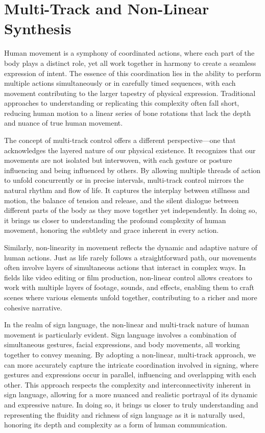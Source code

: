 \documentclass[../../main.tex]{subfiles}
\begin{document}
\chapter{Multi-Track and Non-Linear Synthesis}
\label{ch:multi_track}

Human movement is a symphony of coordinated actions, where each part of the body plays a distinct role, yet all work together in harmony to create a seamless expression of intent. The essence of this coordination lies in the ability to perform multiple actions simultaneously or in carefully timed sequences, with each movement contributing to the larger tapestry of physical expression. Traditional approaches to understanding or replicating this complexity often fall short, reducing human motion to a linear series of bone rotations that lack the depth and nuance of true human movement.

The concept of multi-track control offers a different perspective—one that acknowledges the layered nature of our physical existence. It recognizes that our movements are not isolated but interwoven, with each gesture or posture influencing and being influenced by others. By allowing multiple threads of action to unfold concurrently or in precise intervals, multi-track control mirrors the natural rhythm and flow of life. It captures the interplay between stillness and motion, the balance of tension and release, and the silent dialogue between different parts of the body as they move together yet independently. In doing so, it brings us closer to understanding the profound complexity of human movement, honoring the subtlety and grace inherent in every action.

Similarly, non-linearity in movement reflects the dynamic and adaptive nature of human actions. Just as life rarely follows a straightforward path, our movements often involve layers of simultaneous actions that interact in complex ways. In fields like video editing or film production, non-linear control allows creators to work with multiple layers of footage, sounds, and effects, enabling them to craft scenes where various elements unfold together, contributing to a richer and more cohesive narrative.

In the realm of sign language, the non-linear and multi-track nature of human movement is particularly evident. Sign language involves a combination of simultaneous gestures, facial expressions, and body movements, all working together to convey meaning. By adopting a non-linear, multi-track approach, we can more accurately capture the intricate coordination involved in signing, where gestures and expressions occur in parallel, influencing and overlapping with each other. This approach respects the complexity and interconnectivity inherent in sign language, allowing for a more nuanced and realistic portrayal of its dynamic and expressive nature. In doing so, it brings us closer to truly understanding and representing the fluidity and richness of sign language as it is naturally used, honoring its depth and complexity as a form of human communication.
\end{document}

